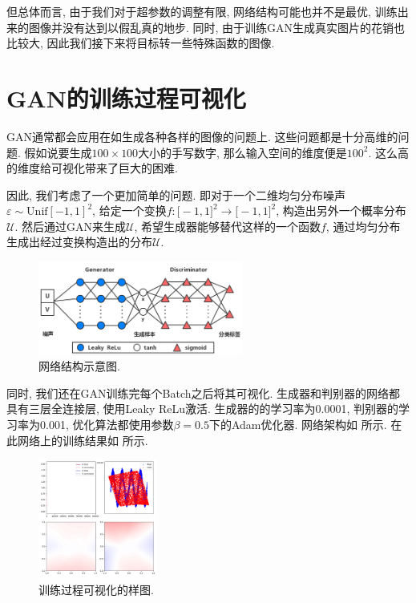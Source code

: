 \documentclass[lang=cn,11pt]{elegantpaper}
\begin{document}
但总体而言, 由于我们对于超参数的调整有限, 网络结构可能也并不是最优, 训练出来的图像并没有达到以假乱真的地步. 同时, 由于训练GAN生成真实图片的花销也比较大, 因此我们接下来将目标转一些特殊函数的图像. 
\section{GAN的训练过程可视化}

GAN通常都会应用在如生成各种各样的图像的问题上. 这些问题都是十分高维的问题. 假如说要生成$100\times 100$大小的手写数字, 那么输入空间的维度便是$100^2$. 这么高的维度给可视化带来了巨大的困难. 

因此, 我们考虑了一个更加简单的问题. 即对于一个二维均匀分布噪声$\varepsilon \sim \mathrm{Unif}[-1,1]^2$, 给定一个变换$f:\mathbb [-1,1]^2 \to \mathbb [-1,1]^2$, 构造出另外一个概率分布$\mathcal U$. 然后通过GAN来生成$\mathcal U$, 希望生成器能够替代这样的一个函数$f$, 通过均匀分布生成出经过变换构造出的分布$\mathcal U$.

\begin{figure}[htbp]
    \centering
    \includegraphics[width=0.6\textwidth]{流程}
    \caption{网络结构示意图. \label{fig:f3}}
\end{figure}


同时, 我们还在GAN训练完每个Batch之后将其可视化. 生成器和判别器的网络都具有三层全连接层, 使用Leaky ReLu激活. 生成器的的学习率为0.0001, 判别器的学习率为0.001, 优化算法都使用参数$\beta=0.5$下的Adam优化器. 网络架构如  所示. 在此网络上的训练结果如  所示. 
\begin{figure}[htbp]
  \centering
    \includegraphics[width=0.35\textwidth]{sin_2_1}
    \caption{训练过程可视化的样图. \label{fig:f1}}
  \end{figure}
\end{document}
